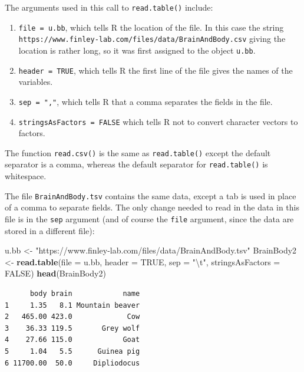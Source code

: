 \documentclass[
]{krantz}
\makeatletter
\newenvironment{Shaded}{\begin{snugshade}}{\end{snugshade}}
\newcommand{\CharTok}[1]{\textcolor[rgb]{0.5,0.5,0.5}{#1}}
\newcommand{\DataTypeTok}[1]{\textcolor[rgb]{0.27,0.27,0.27}{#1}}
\newcommand{\KeywordTok}[1]{\textcolor[rgb]{0.27,0.27,0.27}{\textbf{#1}}}
\newcommand{\NormalTok}[1]{#1}
\newcommand{\OtherTok}[1]{\textcolor[rgb]{0.37,0.37,0.37}{#1}}
\newcommand{\StringTok}[1]{\textcolor[rgb]{0.5,0.5,0.5}{#1}}
\providecommand{\tightlist}{%
  \setlength{\itemsep}{0pt}\setlength{\parskip}{0pt}}
\newenvironment{kframe}{%
\medskip{}
\setlength{\fboxsep}{.8em}
 \def\at@end@of@kframe{}%
 \ifinner\ifhmode%
  \def\at@end@of@kframe{\end{minipage}}%
  \begin{minipage}{\columnwidth}%
 \fi\fi%
 \def\FrameCommand##1{\hskip\@totalleftmargin \hskip-\fboxsep
 \colorbox{shadecolor}{##1}\hskip-\fboxsep
     \hskip-\linewidth \hskip-\@totalleftmargin \hskip\columnwidth}%
 \MakeFramed {\advance\hsize-\width
   \@totalleftmargin\z@ \linewidth\hsize
   \@setminipage}}%
 {\par\unskip\endMakeFramed%
 \at@end@of@kframe}
\renewenvironment{Shaded}{\begin{kframe}}{\end{kframe}}
\makeatother
\begin{document}
The arguments used in this call to \texttt{read.table()} include:

\begin{enumerate}
\def\labelenumi{\arabic{enumi}.}
\tightlist
\item
  \texttt{file\ =\ u.bb}, which tells R the location of the file. In this case the string \texttt{https://www.finley-lab.com/files/data/BrainAndBody.csv} giving the location is rather long, so it was first assigned to the object \texttt{u.bb}.
\item
  \texttt{header\ =\ TRUE}, which tells R the first line of the file gives the names of the variables.
\item
  \texttt{sep\ =\ ","}, which tells R that a comma separates the fields in the file.
\item
  \texttt{stringsAsFactors\ =\ FALSE} which tells R not to convert character vectors to factors.
\end{enumerate}

The function \texttt{read.csv()} is the same as \texttt{read.table()} except the default separator is a comma, whereas the default separator for \texttt{read.table()} is whitespace.

The file \texttt{BrainAndBody.tsv} contains the same data, except a tab is used in place of a comma to separate fields. The only change needed to read in the data in this file is in the \texttt{sep} argument (and of course the \texttt{file} argument, since the data are stored in a different file):

\begin{Shaded}
\begin{Highlighting}[]
\NormalTok{u.bb \textless{}{-}}\StringTok{ "https://www.finley{-}lab.com/files/data/BrainAndBody.tsv"}
\NormalTok{BrainBody2 \textless{}{-}}\StringTok{ }\KeywordTok{read.table}\NormalTok{(}\DataTypeTok{file =}\NormalTok{ u.bb, }\DataTypeTok{header =} \OtherTok{TRUE}\NormalTok{, }\DataTypeTok{sep =} \StringTok{"}\CharTok{\textbackslash{}t}\StringTok{"}\NormalTok{, }
                         \DataTypeTok{stringsAsFactors =} \OtherTok{FALSE}\NormalTok{)}
\KeywordTok{head}\NormalTok{(BrainBody2)}
\end{Highlighting}
\end{Shaded}

\begin{verbatim}
      body brain            name
1     1.35   8.1 Mountain beaver
2   465.00 423.0             Cow
3    36.33 119.5       Grey wolf
4    27.66 115.0            Goat
5     1.04   5.5      Guinea pig
6 11700.00  50.0     Dipliodocus
\end{verbatim}
\end{document}
